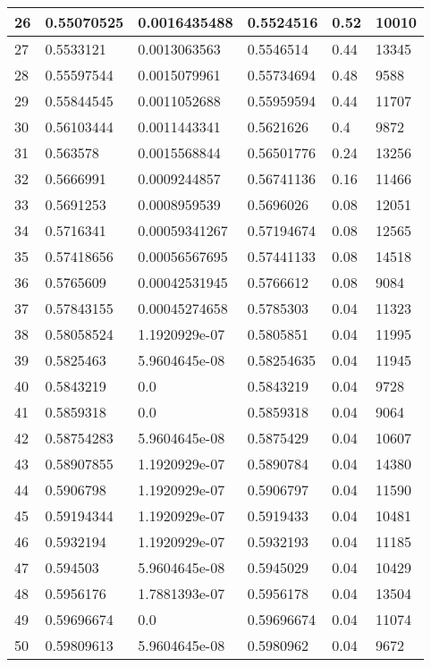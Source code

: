 \begin{longtable}{|l|l|l|l|l|l|}
26 & 0.55070525 & 0.0016435488 & 0.5524516 & 0.52 & 10010 \\ \hline 
27 & 0.5533121 & 0.0013063563 & 0.5546514 & 0.44 & 13345 \\ \hline 
28 & 0.55597544 & 0.0015079961 & 0.55734694 & 0.48 & 9588 \\ \hline 
29 & 0.55844545 & 0.0011052688 & 0.55959594 & 0.44 & 11707 \\ \hline 
30 & 0.56103444 & 0.0011443341 & 0.5621626 & 0.4 & 9872 \\ \hline 
31 & 0.563578 & 0.0015568844 & 0.56501776 & 0.24 & 13256 \\ \hline 
32 & 0.5666991 & 0.0009244857 & 0.56741136 & 0.16 & 11466 \\ \hline 
33 & 0.5691253 & 0.0008959539 & 0.5696026 & 0.08 & 12051 \\ \hline 
34 & 0.5716341 & 0.00059341267 & 0.57194674 & 0.08 & 12565 \\ \hline 
35 & 0.57418656 & 0.00056567695 & 0.57441133 & 0.08 & 14518 \\ \hline 
36 & 0.5765609 & 0.00042531945 & 0.5766612 & 0.08 & 9084 \\ \hline 
37 & 0.57843155 & 0.00045274658 & 0.5785303 & 0.04 & 11323 \\ \hline 
38 & 0.58058524 & 1.1920929e-07 & 0.5805851 & 0.04 & 11995 \\ \hline 
39 & 0.5825463 & 5.9604645e-08 & 0.58254635 & 0.04 & 11945 \\ \hline 
40 & 0.5843219 & 0.0 & 0.5843219 & 0.04 & 9728 \\ \hline 
41 & 0.5859318 & 0.0 & 0.5859318 & 0.04 & 9064 \\ \hline 
42 & 0.58754283 & 5.9604645e-08 & 0.5875429 & 0.04 & 10607 \\ \hline 
43 & 0.58907855 & 1.1920929e-07 & 0.5890784 & 0.04 & 14380 \\ \hline 
44 & 0.5906798 & 1.1920929e-07 & 0.5906797 & 0.04 & 11590 \\ \hline 
45 & 0.59194344 & 1.1920929e-07 & 0.5919433 & 0.04 & 10481 \\ \hline 
46 & 0.5932194 & 1.1920929e-07 & 0.5932193 & 0.04 & 11185 \\ \hline 
47 & 0.594503 & 5.9604645e-08 & 0.5945029 & 0.04 & 10429 \\ \hline 
48 & 0.5956176 & 1.7881393e-07 & 0.5956178 & 0.04 & 13504 \\ \hline 
49 & 0.59696674 & 0.0 & 0.59696674 & 0.04 & 11074 \\ \hline 
50 & 0.59809613 & 5.9604645e-08 & 0.5980962 & 0.04 & 9672 \\ \hline 

\end{longtable}

